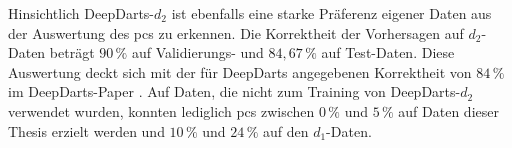Hinsichtlich DeepDarts-$d_2$ ist ebenfalls eine starke Präferenz eigener Daten aus der Auswertung des \ac{pcs} zu erkennen. Die Korrektheit der Vorhersagen auf $d_2$-Daten beträgt $90\,\%$ auf Validierungs- und $84,67\,\%$ auf Test-Daten. Diese Auswertung deckt sich mit der für DeepDarts angegebenen Korrektheit von $84\,\%$ im DeepDarts-Paper \cite{deepdarts}. Auf Daten, die nicht zum Training von DeepDarts-$d_2$ verwendet wurden, konnten lediglich \ac{pcs} zwischen $0\,\%$ und $5\,\%$ auf Daten dieser Thesis erzielt werden und $10\,\%$ und $24\,\%$ auf den $d_1$-Daten.
